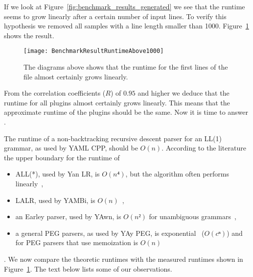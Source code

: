 If we look at Figure~\ref{fig:benchmark_results_generated} we see that the runtime seems to grow linearly after a certain number of input lines. To verify this hypothesis we removed all samples with a line length smaller than 1000. Figure~\ref{fig:benchmark_results_generated_above_1000} shows the result.

\begin{figure}[H]
  \centering
    \texttt{[image: BenchmarkResultRuntimeAbove1000]}
  \caption{The diagrams above shows that the runtime for the first lines of the file \FileGeneratedHundredThousand{} almost certainly grows linearly.}
  \label{fig:benchmark_results_generated_above_1000}
\end{figure}

From the correlation coefficients ($R$) of $0.95$ and higher we deduce that the runtime for all plugins almost certainly grows linearly. This means that the approximate runtime of the plugins should be the same. Now it is time to answer .

\speed*

The runtime of a non-backtracking recursive descent parser for an LL(1) grammar, as used by YAML CPP, should be $O(n)$. According to the literature the upper boundary for the runtime of

\begin{itemize}
  \item \gls{ALL(*)}, used by Yan LR, is $O(n⁴)$, but the algorithm often performs linearly~\cite[p. 1]{parr2014adaptive},
  \item LALR, used by YAMBi, is $O(n)$~\cite{baxter2017runtime},
  \item an Earley parser, used by YAwn, is $O(n²)$ for unambiguous grammars~\cite[p. 145]{hopcroft1969formal},
  \item a general PEG parsers, as used by YAy PEG, is exponential~\cite[p. 1]{moss2014derivatives} ($O(cⁿ)$) and for PEG parsers that use memoization is $O(n)$~\cite{ford2002packrat}
\end{itemize}

. We now compare the theoretic runtimes with the measured runtimes shown in Figure~\ref{fig:benchmark_results_generated_above_1000}. The text below lists some of our observations.

